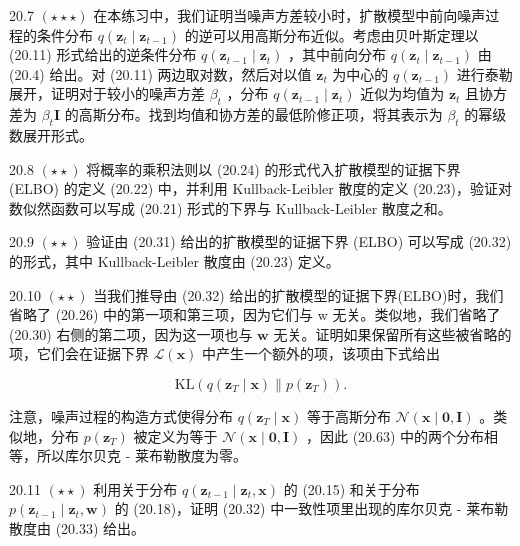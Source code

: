 \documentclass[10pt]{report}
\begin{document}
20.7 \(\left( {\star  \star   \star  }\right)\) 在本练习中，我们证明当噪声方差较小时，扩散模型中前向噪声过程的条件分布 \(q\left( {{\mathbf{z}}_{t} \mid  {\mathbf{z}}_{t - 1}}\right)\) 的逆可以用高斯分布近似。考虑由贝叶斯定理以 (20.11) 形式给出的逆条件分布 \(q\left( {{\mathbf{z}}_{t - 1} \mid  {\mathbf{z}}_{t}}\right)\) ，其中前向分布 \(q\left( {{\mathbf{z}}_{t} \mid  {\mathbf{z}}_{t - 1}}\right)\) 由 (20.4) 给出。对 (20.11) 两边取对数，然后对以值 \({\mathbf{z}}_{t}\) 为中心的 \(q\left( {\mathbf{z}}_{t - 1}\right)\) 进行泰勒展开，证明对于较小的噪声方差 \({\beta }_{t}\) ，分布 \(q\left( {{\mathbf{z}}_{t - 1} \mid  {\mathbf{z}}_{t}}\right)\) 近似为均值为 \({\mathbf{z}}_{t}\) 且协方差为 \({\beta }_{t}\mathbf{I}\) 的高斯分布。找到均值和协方差的最低阶修正项，将其表示为 \({\beta }_{t}\) 的幂级数展开形式。

20.8 \(\left( {\star  \star  }\right)\) 将概率的乘积法则以 (20.24) 的形式代入扩散模型的证据下界 (ELBO) 的定义 (20.22) 中，并利用 Kullback-Leibler 散度的定义 (20.23)，验证对数似然函数可以写成 (20.21) 形式的下界与 Kullback-Leibler 散度之和。

20.9 \(\left( {\star  \star  }\right)\) 验证由 (20.31) 给出的扩散模型的证据下界 (ELBO) 可以写成 (20.32) 的形式，其中 Kullback-Leibler 散度由 (20.23) 定义。

20.10 \(\left( {\star  \star  }\right)\) 当我们推导由 (20.32) 给出的扩散模型的证据下界(ELBO)时，我们省略了 (20.26) 中的第一项和第三项，因为它们与 w 无关。类似地，我们省略了 (20.30) 右侧的第二项，因为这一项也与 \(\mathbf{w}\) 无关。证明如果保留所有这些被省略的项，它们会在证据下界 \(\mathcal{L}\left( \mathbf{x}\right)\) 中产生一个额外的项，该项由下式给出

\[
\mathrm{{KL}}\left( {q\left( {{\mathbf{z}}_{T} \mid  \mathbf{x}}\right) \parallel p\left( {\mathbf{z}}_{T}\right) }\right) . \tag{20.63}
\]

注意，噪声过程的构造方式使得分布 \(q\left( {{\mathbf{z}}_{T} \mid  \mathbf{x}}\right)\) 等于高斯分布 \(\mathcal{N}\left( {\mathbf{x} \mid  \mathbf{0},\mathbf{I}}\right)\) 。类似地，分布 \(p\left( {\mathbf{z}}_{T}\right)\) 被定义为等于 \(\mathcal{N}\left( {\mathbf{x} \mid  \mathbf{0},\mathbf{I}}\right)\) ，因此 (20.63) 中的两个分布相等，所以库尔贝克 - 莱布勒散度为零。

20.11 \(\left( {\star  \star  }\right)\) 利用关于分布 \(q\left( {{\mathbf{z}}_{t - 1} \mid  {\mathbf{z}}_{t},\mathbf{x}}\right)\) 的 (20.15) 和关于分布 \(p\left( {{\mathbf{z}}_{t - 1} \mid  {\mathbf{z}}_{t},\mathbf{w}}\right)\) 的 (20.18)，证明 (20.32) 中一致性项里出现的库尔贝克 - 莱布勒散度由 (20.33) 给出。
\end{document}
